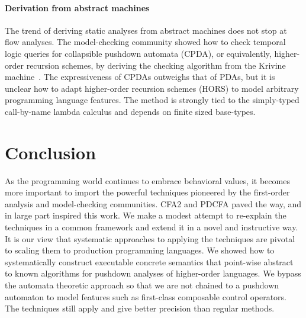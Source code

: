 \paragraph{Derivation from abstract machines}
The trend of deriving static analyses from abstract machines does not stop at flow analyses.
%
The model-checking community showed how to check temporal logic queries for collapsible pushdown automata (CPDA), or equivalently, higher-order recursion schemes, by deriving the checking algorithm from the Krivine machine~\citep{ianjohnson:Salvati:2011:KMH:2027223.2027239}.
%
The expressiveness of CPDAs outweighs that of PDAs, but it is unclear how to adapt higher-order recursion schemes (HORS) to model arbitrary programming language features.
%
The method is strongly tied to the simply-typed call-by-name lambda calculus and depends on finite sized base-types.
%


\section{Conclusion}

As the programming world continues to embrace behavioral values, it becomes more important to import the powerful techniques pioneered by the first-order analysis and model-checking communities.
%
CFA2 and PDCFA paved the way, and in large part inspired this work.
%
We make a modest attempt to re-explain the techniques in a common framework and extend it in a novel and instructive way.
%
It is our view that systematic approaches to applying the techniques are pivotal to scaling them to production programming languages.
%
We showed how to systematically construct executable concrete semantics that point-wise abstract to known algorithms for pushdown analyses of higher-order languages.
%
We bypass the automata theoretic approach so that we are not chained to a pushdown automaton to model features such as first-class composable control operators.
%
The techniques still apply and give better precision than regular methods.


